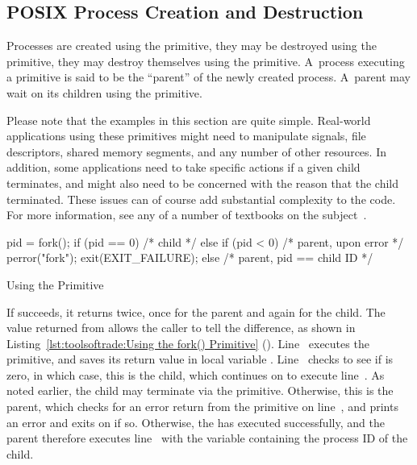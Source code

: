\subsection{POSIX Process Creation and Destruction}
\label{sec:toolsoftrade:POSIX Process Creation and Destruction}

Processes are created using the  primitive, they may
be destroyed using the  primitive, they may destroy
themselves using the  primitive.
A~process executing a  primitive is said to be the ``parent''
of the newly created process.
A~parent may wait on its children using the  primitive.

Please note that the examples in this section are quite simple.
Real-world applications using these primitives might need to manipulate
signals, file descriptors, shared memory segments, and any number of
other resources.
In addition, some applications need to take specific actions if a given
child terminates, and might also need to be concerned with the reason
that the child terminated.
These issues can of course add substantial complexity to the code.
For more information, see any of a number of textbooks on the
subject~\cite{WRichardStevens1992,StewartWeiss2013UNIX}.

\begin{listing}[tbp]
\begin{fcvlabel}
\begin{VerbatimL}[commandchars=\%\[\]]
pid = fork();%
if (pid == 0) {%
	/* child */%
} else if (pid < 0) {%
	/* parent, upon error */%
	perror("fork");
	exit(EXIT_FAILURE);%
} else {
	/* parent, pid == child ID */%
}
\end{VerbatimL}
\end{fcvlabel}
\caption{Using the  Primitive}
\label{lst:toolsoftrade:Using the fork() Primitive}
\end{listing}

\begin{fcvref}
If  succeeds, it returns twice, once for the parent
and again for the child.
The value returned from  allows the caller to tell
the difference, as shown in
Listing~\ref{lst:toolsoftrade:Using the fork() Primitive}
().
Line~ executes the  primitive, and saves
its return value in local variable .
Line~ checks to see if  is zero, in which case,
this is the child, which continues on to execute line~.
As noted earlier, the child may terminate via the  primitive.
Otherwise, this is the parent, which checks for an error return from
the  primitive on line~, and prints an error
and exits on  if so.
Otherwise, the  has executed successfully, and the parent
therefore executes line~ with the variable 
containing the process ID of the child.
\end{fcvref}

